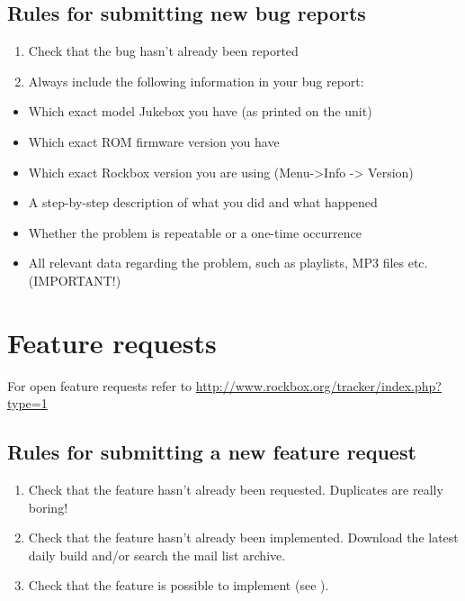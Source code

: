 \subsection{Rules for submitting new bug reports}

\begin{enumerate}
\item  Check that the bug hasn't already been reported
\item  Always include the following information in your bug report:
\end{enumerate}

\begin{itemize}
\item  Which exact model Jukebox you have (as printed on the unit)
\item  Which exact ROM firmware version you have
\item  Which exact Rockbox version you are using
(Menu{}-{\textgreater}Info {}-{\textgreater} Version)
\item  A step{}-by{}-step description of what you did and what happened
\item  Whether the problem is repeatable or a one{}-time occurrence
\item  All relevant data regarding the problem, such as playlists, MP3
files etc. (IMPORTANT!) 
\end{itemize}

\section{Feature requests}
For open feature requests refer to
\url{http://www.rockbox.org/tracker/index.php?type=1}

\subsection{Rules for submitting a new feature request}

\begin{enumerate}
\item Check that the feature hasn't already been requested. 
  Duplicates are really boring!
\item Check that the feature hasn't already been implemented. 
  Download the latest daily build and/or search the mail list archive.
\item Check that the feature is possible to implement (see ).
\end{enumerate}

